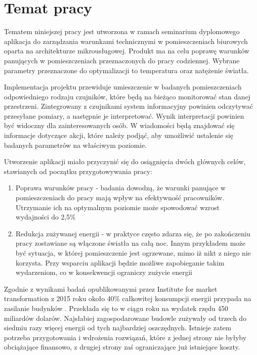 \documentclass[11pt, a4]{article} %
\begin{document}
\tableofcontents

\section{Temat pracy}

Tematem niniejszej pracy jest utworzona w ramach seminarium dyplomowego aplikacja do 
zarządzania warunkami technicznymi w pomieszczeniach biurowych oparta na architekturze 
mikrousługowej. Produkt ma na celu poprawę warunków panujących w pomieszczeniach 
przeznaczonych do pracy codziennej. Wybrane parametry przeznaczone do optymalizacji to 
temperatura oraz natężenie światła.

Implementacja projektu przewiduje umieszczenie w badanych pomieszczeniach odpowiedniego 
rodzaju czujników, które będą na bieżąco monitorować stan danej przestrzeni. 
Zintegrowany z czujnikami system informacyjny powinien odczytywać przesyłane 
pomiary, a następnie je interpretować. Wynik interpretacji powinien być widoczny dla 
zainteresowanych osób. W wiadomości będą znajdować się informacje dotyczące 
akcji, które należy podjąć, aby umożliwić ustalenie się badanych parametrów na 
właściwym poziomie.

Utworzenie aplikacji miało przyczynić się do osiągnięcia dwóch głównych 
celów, stawianych od początku przygotowywania pracy:

\begin{enumerate} %
    \item Poprawa warunków pracy - badania \parencite{oseland:2012ak} dowodzą, że 
    warunki panujące w pomieszczeniach do pracy mają wpływ na efektywność pracowników. 
    Utrzymanie ich na optymalnym poziomie może spowodować wzrost wydajności do 2,5\%
    \item Redukcja zużywanej energii - w praktyce często zdarza się, że po zakończeniu 
    pracy zostawiane są włączone światła na całą noc. Innym przykładem może być 
    sytuacja, w której pomieszczenie jest ogrzewane, mimo iż nikt z niego nie korzysta. 
    Przy wsparciu aplikacji będzie możliwe zapobieganie takim wydarzeniom, co w 
    konsekwencji ograniczy zużycie energii
\end{enumerate}

Zgodnie z wynikami badań opublikowanymi przez Institute for market transformation z 
2015 roku około 40\% całkowitej konsumpcji energii przypada na zasilanie budynków 
\parencite{Imt.org:2015ag}. Przekłada się to w ciągu roku na wydatek rzędu 450 miliardów 
dolarów. Najsłabiej zagospodarowane budowle zużywały od trzech do siedmiu razy więcej 
energii od tych najbardziej oszczędnych. Istnieje zatem potrzeba przygotowania 
i wdrożenia rozwiązań, które z jednej strony nie byłyby obciążające finansowo, z 
drugiej strony zaś ograniczające już istniejące koszty. 
\end{document}
